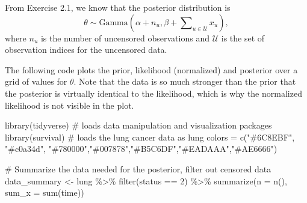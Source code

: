 \documentclass[
  letterpaper,
  DIV=11,
  numbers=noendperiod]{scrartcl}
\newenvironment{Shaded}{\begin{snugshade}}{\end{snugshade}}
\newcommand{\AttributeTok}[1]{\textcolor[rgb]{0.40,0.45,0.13}{#1}}
\newcommand{\CommentTok}[1]{\textcolor[rgb]{0.37,0.37,0.37}{#1}}
\newcommand{\DecValTok}[1]{\textcolor[rgb]{0.68,0.00,0.00}{#1}}
\newcommand{\FunctionTok}[1]{\textcolor[rgb]{0.28,0.35,0.67}{#1}}
\newcommand{\NormalTok}[1]{\textcolor[rgb]{0.00,0.23,0.31}{#1}}
\newcommand{\OtherTok}[1]{\textcolor[rgb]{0.00,0.23,0.31}{#1}}
\newcommand{\SpecialCharTok}[1]{\textcolor[rgb]{0.37,0.37,0.37}{#1}}
\newcommand{\StringTok}[1]{\textcolor[rgb]{0.13,0.47,0.30}{#1}}
\begin{document}
\begin{tcolorbox}[enhanced jigsaw, coltitle=black, breakable, colbacktitle=quarto-callout-note-color!10!white, colframe=quarto-callout-note-color-frame, bottomrule=.15mm, toprule=.15mm, rightrule=.15mm, arc=.35mm, colback=white, opacityback=0, bottomtitle=1mm, leftrule=.75mm, title={Solution}, titlerule=0mm, toptitle=1mm, left=2mm, opacitybacktitle=0.6]

From Exercise 2.1, we know that the posterior distribution is
\[\theta \sim \mathrm{Gamma}(\alpha + n_u, \beta + \sum\nolimits_{u \in \mathcal{U}} x_u),\]
where \(n_u\) is the number of uncensored observations and
\(\mathcal{U}\) is the set of observation indices for the uncensored
data.

The following code plots the prior, likelihood (normalized) and
posterior over a grid of values for \(\theta\). Note that the data is so
much stronger than the prior that the posterior is virtually identical
to the likelihood, which is why the normalized likelihood is not visible
in the plot.

\begin{Shaded}
\begin{Highlighting}[]
\FunctionTok{library}\NormalTok{(tidyverse) }\CommentTok{\# loads data manipulation and visualization packages}
\FunctionTok{library}\NormalTok{(survival) }\CommentTok{\# loads the lung cancer data as \textasciigrave{}lung\textasciigrave{}}
\NormalTok{colors }\OtherTok{=} \FunctionTok{c}\NormalTok{(}\StringTok{"\#6C8EBF"}\NormalTok{, }\StringTok{"\#c0a34d"}\NormalTok{, }\StringTok{"\#780000"}\NormalTok{,}\StringTok{"\#007878"}\NormalTok{,}\StringTok{"\#B5C6DF"}\NormalTok{,}\StringTok{"\#EADAAA"}\NormalTok{,}\StringTok{"\#AE6666"}\NormalTok{)}
\end{Highlighting}
\end{Shaded}

\begin{Shaded}
\begin{Highlighting}[]
\CommentTok{\# Summarize the data needed for the posterior, filter out censored data}
\NormalTok{data\_summary }\OtherTok{\textless{}{-}}\NormalTok{ lung }\SpecialCharTok{\%\textgreater{}\%} \FunctionTok{filter}\NormalTok{(status }\SpecialCharTok{==} \DecValTok{2}\NormalTok{) }\SpecialCharTok{\%\textgreater{}\%} \FunctionTok{summarize}\NormalTok{(}\AttributeTok{n =} \FunctionTok{n}\NormalTok{(), }\AttributeTok{sum\_x =} \FunctionTok{sum}\NormalTok{(time))}
\end{Highlighting}
\end{Shaded}


\end{tcolorbox}
\end{document}
